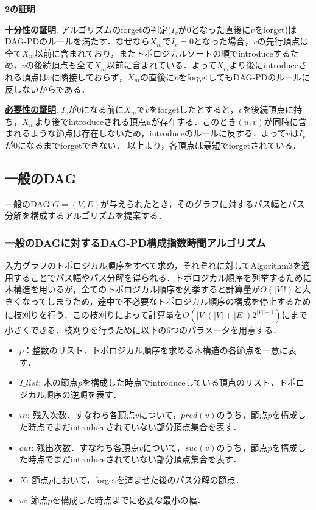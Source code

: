 \documentclass{kuisthesis}           %
\begin{document}
 \textbf{2の証明}

 \textbf{\underline{十分性の証明}}.
 アルゴリズムのforgetの判定($I_v$が0となった直後に$v$をforget)はDAG-PDのルールを満たす．なぜなら$X_m$で$I_v=0$となった場合，$v$の先行頂点は全て$X_m$以前に含まれており，またトポロジカルソートの順でintroduceするため，$v$の後続頂点も全て$X_m$以前に含まれている．よって$X_m$より後にintroduceされる頂点は$v$に隣接しておらず，$X_m$の直後に$v$をforgetしてもDAG-PDのルールに反しないからである．

 \textbf{\underline{必要性の証明}}.
 $I_v$が0になる前に$X_m$で$v$をforgetしたとすると，$v$を後続頂点に持ち，$X_m$より後でintroduceされる頂点$u$が存在する．このとき$(u, v)$が同時に含まれるような節点は存在しないため，introduceのルールに反する．よって$v$は$I_v$が0になるまでforgetできない．
 以上より，各頂点は最短でforgetされている．

 
 \subsection{一般のDAG}
一般のDAG $G=(V, E)$が与えられたとき，そのグラフに対するパス幅とパス分解を構成するアルゴリズムを提案する．

 \subsubsection{一般のDAGに対するDAG-PD構成指数時間アルゴリズム}

 入力グラフのトポロジカル順序をすべて求め，それぞれに対してAlgorithm3を適用することでパス幅やパス分解を得られる．トポロジカル順序を列挙するために木構造を用いるが，全てのトポロジカル順序を列挙すると計算量が$O(|V|!)$と大きくなってしまうため，途中で不必要なトポロジカル順序の構成を停止するために枝刈りを行う．この枝刈りによって計算量を$O(|V|(|V|+|E|)2^{|V|-1})$にまで小さくできる．枝刈りを行うために以下の6つのパラメータを用意する．
 
 \begin{itemize}
     \item $p$：整数のリスト．トポロジカル順序を求める木構造の各節点を一意に表す．
     \item $I\_list$: 木の節点$p$を構成した時点でintroduceしている頂点のリスト．トポロジカル順序の逆順を表す．
     \item $in$: 残入次数．すなわち各頂点$v$について，$pred(v)$のうち，節点$p$を構成した時点でまだintroduceされていない部分頂点集合を表す．
     \item $out$: 残出次数．すなわち各頂点$v$について，$suc(v)$のうち，節点$p$を構成した時点でまだintroduceされていない部分頂点集合を表す．
     \item $X$: 節点$p$において，forgetを済ませた後のパス分解の節点．
     \item $w$: 節点$p$を構成した時点までに必要な最小の幅．
 \end{itemize}
\end{document}

